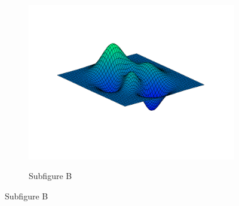 \documentclass[a4paper,12pt]{article}
\begin{document}
\begin{figure}[tbph]
\begin{center}
\begin{minipage}{0.9\linewidth}
						\begin{subfigure}[t]{\linewidth}
							\begin{center}
								\includegraphics[trim={0cm 0cm 0cm 0cm},clip,height=0.2\textheight,width=1\linewidth,keepaspectratio]{../Figures/Plain/exfigure2} \\
							\end{center}
							\vspace{-0.5cm}
							\caption{Subfigure B} \label{subfig:exsubfigureB}
							\vspace{0.5cm}
						\end{subfigure}
				\end{minipage}
			\end{center}
		\end{figure}
\end{document}
